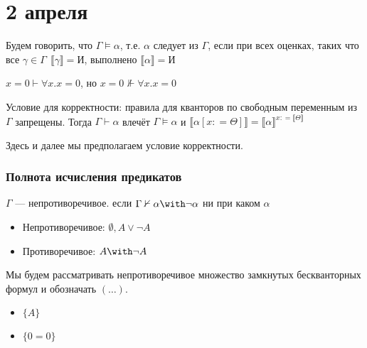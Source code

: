 \chapter{2 апреля}

\begin{definition}
    Будем говорить, что \(\Gamma \models \alpha\), т.е. \(\alpha\) следует из \(\Gamma\), если при всех оценках, таких что все \(\gamma \in \Gamma \ \ \llbracket \gamma \rrbracket = \text{И}\), выполнено \(\llbracket \alpha \rrbracket = \text{И}\)
\end{definition}

\begin{example}
    \(x = 0 \vdash \forall x.x = 0\), но \(x = 0 \nVdash \forall x.x = 0\)
\end{example}

Условие для корректности: правила для кванторов по свободным переменным из \(\Gamma\) запрещены. Тогда \(\Gamma \vdash \alpha\) влечёт \(\Gamma \models \alpha\) и \(\llbracket \alpha [x: = \Theta] \rrbracket = \llbracket \alpha \rrbracket^{x: = \llbracket \Theta \rrbracket}\)

\begin{remark}
    Здесь и далее мы предполагаем условие корректности.
\end{remark}

\subsection{Полнота исчисления предикатов}

\begin{definition}
    \(\Gamma\) --- непротиворечивое. если \(\Gamma \nvdash \alpha \with \neg \alpha\) ни при каком \(\alpha\)
\end{definition}

\begin{example}\itemfix
    \begin{itemize}
        \item Непротиворечивое: \(\emptyset, A \lor \neg A\)
        \item Противоречивое: \(A \with \neg A\)
    \end{itemize}
\end{example}

Мы будем рассматривать непротиворечивое множество замкнутых бескванторных формул и обозначать \((\ldots)\).
\begin{example}\itemfix
    \begin{itemize}
        \item \(\{A\}\)
        \item \(\{0 = 0\}\)
    \end{itemize}
\end{example}

